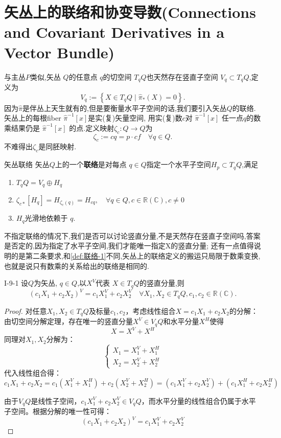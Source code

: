 \documentclass[../main.tex]{subfiles}
\begin{document}
\chapter{矢丛上的联络和协变导数(Connections and Covariant Derivatives in a Vector Bundle)}
与主丛$P$类似,矢丛 $Q$的任意点 $q$的切空间 $T_qQ$也天然存在竖直子空间 $V_q \subset T_q Q$,定义为\[
  V_q := \left\{ X \in T_qQ  \mid \hat{\pi}_*(X) = 0 \right\} 
.\] 
因为$\hat{\pi}$是伴丛上天生就有的,但是要衡量水平子空间的话,我们要引入矢丛$Q$的联络.矢丛上的每根fiber $\hat{\pi}^{-1}[x]$是实(复)矢量空间,
用实(复)数$c$对 $\hat{\pi}^{-1}[x]$ 任一点$q$的数乘结果仍是 $\hat{\pi}^{-1}[x]$ 的点.定义映射$\zeta_c : Q\to Q$为
\[
  \zeta_c := cq = p\cdot cf\quad \forall q \in Q 
.\] 
不难得出$\zeta_c$是同胚映射.
 \begin{definition}
   {}{矢丛联络} 
   矢丛$Q$上的一个\textbf{联络}是对每点 $q \in Q$指定一个水平子空间$H_p \subset T_q Q$,满足
   \begin{enumerate}
     \item $T_q Q = V_q \oplus H_q$ 
     \item $\zeta_{c*} [H_q] = H_{\zeta_c(q)} = H_{cq}, \quad \forall  q \in Q , c \in \mathbb{R}(\mathbb{C}) ,c \neq 0$
     \item $H_q$光滑地依赖于 $q$.
   \end{enumerate}
\end{definition}
\begin{note}
  不指定联络的情况下,我们是否可以讨论竖直分量,不是天然存在竖直子空间吗,答案是否定的,因为指定了水平子空间,我们才能唯一指定X的竖直分量;
  还有一点值得说明的是第二条要求,和\ref{def:联络-1}不同,矢丛上的联络定义的搬运只局限于数乘变换,也就是说只有数乘的关系给出的联络是相同的.
\end{note}
\begin{theorem}
  {}{I-9-1}
  设$Q$为矢丛, $q \in Q$,以$X^V$代表 $X \in T_q Q$的竖直分量,则\[
    (c_1 X_1 + c_2 X_2)^V = c_1X_1^V + c_2 X_2^V \quad \forall X_1,X_2 \in  T_q Q, c_1,c_2 \in \mathbb{R}(\mathbb{C})  
  .\] 
\end{theorem}
\begin{proof}
对任意$X_1, X_2 \in T_qQ$及标量$c_1, c_2$，考虑线性组合$X = c_1X_1 + c_2X_2$的分解：
由切空间分解定理，存在唯一的竖直分量$X^V \in V_qQ$和水平分量$X^H$使得
\[
X = X^V + X^H
\]
同理对$X_1,X_2$分解为：
\[
\begin{cases}
X_1 = X_1^V + X_1^H \\
X_2 = X_2^V + X_2^H
\end{cases}
\]
代入线性组合得：
\[
c_1X_1 + c_2X_2 = c_1(X_1^V + X_1^H) + c_2(X_2^V + X_2^H) = (c_1X_1^V + c_2X_2^V) + (c_1X_1^H + c_2X_2^H)
\]

由于$V_qQ$是线性子空间，$c_1X_1^V + c_2X_2^V \in V_qQ$，而水平分量的线性组合仍属于水平子空间。根据分解的唯一性可得：
\[
(c_1X_1 + c_2X_2)^V = c_1X_1^V + c_2X_2^V
\]
\end{proof}
\end{document}
